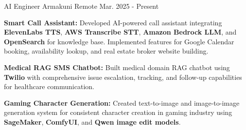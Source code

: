 
\begin{cventries}

  \cventry
    {AI Engineer} %
    {Armakuni} %
    {Remote} %
    {Mar. 2025 - Present} %
    {
      \begin{cvitems} %
        \item \textbf{Smart Call Assistant:} Developed AI-powered call assistant integrating \textbf{ElevenLabs TTS}, \textbf{AWS Transcribe STT}, \textbf{Amazon Bedrock LLM}, and \textbf{OpenSearch} for knowledge base. Implemented features for Google Calendar booking, availability lookup, and real estate broker website building.
        \vspace{0.4em}
        \item \textbf{Medical RAG SMS Chatbot:} Built medical domain RAG chatbot using \textbf{Twilio} with comprehensive issue escalation, tracking, and follow-up capabilities for healthcare communication.
        \vspace{0.4em}
        \item \textbf{Gaming Character Generation:} Created text-to-image and image-to-image generation system for consistent character creation in gaming industry using \textbf{SageMaker}, \textbf{ComfyUI}, and \textbf{Qwen image edit models}.
      \end{cvitems}
    }


\end{cventries}
